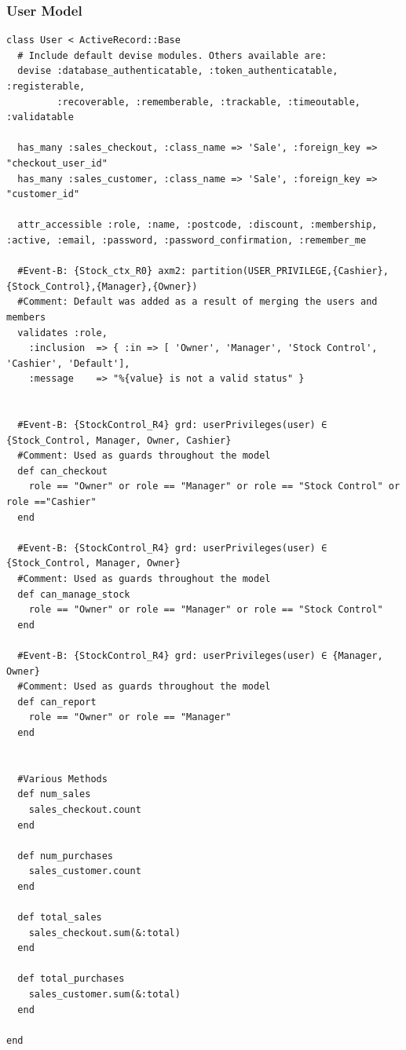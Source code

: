 \documentclass[a4paper]{article}
\begin{document}
\subsubsection{User Model}
\begin{verbatim}
class User < ActiveRecord::Base
  # Include default devise modules. Others available are:
  devise :database_authenticatable, :token_authenticatable, :registerable,
         :recoverable, :rememberable, :trackable, :timeoutable, :validatable

  has_many :sales_checkout, :class_name => 'Sale', :foreign_key => "checkout_user_id"
  has_many :sales_customer, :class_name => 'Sale', :foreign_key => "customer_id"
  
  attr_accessible :role, :name, :postcode, :discount, :membership, :active, :email, :password, :password_confirmation, :remember_me

  #Event-B: {Stock_ctx_R0} axm2: partition(USER_PRIVILEGE,{Cashier},{Stock_Control},{Manager},{Owner})
  #Comment: Default was added as a result of merging the users and members
  validates :role,
    :inclusion  => { :in => [ 'Owner', 'Manager', 'Stock Control', 'Cashier', 'Default'],
    :message    => "%{value} is not a valid status" }
  

  #Event-B: {StockControl_R4} grd: userPrivileges(user) ∈ {Stock_Control, Manager, Owner, Cashier}
  #Comment: Used as guards throughout the model
  def can_checkout
    role == "Owner" or role == "Manager" or role == "Stock Control" or role =="Cashier"
  end

  #Event-B: {StockControl_R4} grd: userPrivileges(user) ∈ {Stock_Control, Manager, Owner}
  #Comment: Used as guards throughout the model  
  def can_manage_stock
    role == "Owner" or role == "Manager" or role == "Stock Control"
  end

  #Event-B: {StockControl_R4} grd: userPrivileges(user) ∈ {Manager, Owner}
  #Comment: Used as guards throughout the model  
  def can_report
    role == "Owner" or role == "Manager"
  end


  #Various Methods
  def num_sales
    sales_checkout.count
  end

  def num_purchases
    sales_customer.count
  end

  def total_sales
    sales_checkout.sum(&:total)
  end

  def total_purchases
    sales_customer.sum(&:total)
  end
  
end

\end{verbatim}
\end{document}
